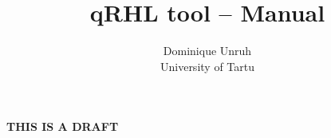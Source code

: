 \newif\iffullversion
\fullversiontrue



\let\standalonemanual1



\newcommand\qrhlautoref[1]{\autoref{main:#1} in~\cite{qrhl-paper-from-manual}}
\newcommand\qrhlautorefx[1]{\autoref{main:#1}}

\renewcommand\refrule[1]{\hbox{\textsc{#1}} rule}
\renewcommand\ruleref[1]{rule \hbox{\textsc{#1}}}
\renewcommand\rulerefx[1]{\hbox{\textsc{#1}}}
\renewcommand\Ruleref[1]{Rule \hbox{\textsc{#1}}}




\title{qRHL tool -- Manual}
\author{Dominique Unruh\\\small University of Tartu}
\date{}

\maketitle

\ifdraft
\begin{center}
  \LARGE\bfseries
  THIS IS A DRAFT
\end{center}
\fi

\let\subsubsection\subsection
\let\subsection\section



\printbibliography

\renewcommand\symbolindexentry[4]{\noindent\hbox{\hbox to 2in{$#2$\hfill}\parbox[t]{3.5in}{#3}\hbox to 1cm{\hfill #4}}\\[2pt]}

\fullonly \printsymbolindex

\fullonly \printindex  




